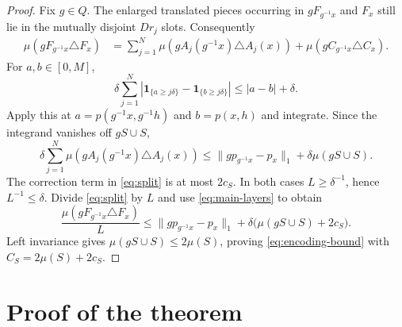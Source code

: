 \documentclass[11pt]{article}
\newcommand{\1}{\mathbf 1}
\begin{document}
\begin{proof}
Fix $g\in Q$.  The enlarged translated pieces occurring in
$gF_{g^{-1}x}$ and $F_x$ still lie in the mutually disjoint $Dr_j$ slots.
Consequently
\begin{align}
 \mu(gF_{g^{-1}x}\triangle F_x)
 &=\sum_{j=1}^N\mu(gA_j(g^{-1}x)\triangle A_j(x))
   +\mu(gC_{g^{-1}x}\triangle C_x).\label{eq:split}
\end{align}
For $a,b\in[0,M]$,
\begin{equation}\label{eq:scalar-quantization}
 \delta\sum_{j=1}^N
 \left|\1_{\{a\geq j\delta\}}-\1_{\{b\geq j\delta\}}\right|
 \leq |a-b|+\delta.
\end{equation}
Apply this at
$a=p(g^{-1}x,g^{-1}h)$ and $b=p(x,h)$ and integrate.  Since the integrand
vanishes off $gS\cup S$,
\begin{equation}\label{eq:main-layers}
 \delta\sum_{j=1}^N\mu(gA_j(g^{-1}x)\triangle A_j(x))
 \leq\|g p_{g^{-1}x}-p_x\|_1+\delta\mu(gS\cup S).
\end{equation}
The correction term in \eqref{eq:split} is at most $2c_S$.  In both cases
$L\geq\delta^{-1}$, hence $L^{-1}\leq\delta$.  Divide
\eqref{eq:split} by $L$ and use \eqref{eq:main-layers} to obtain
\[
 \frac{\mu(gF_{g^{-1}x}\triangle F_x)}{L}
 \leq\|g p_{g^{-1}x}-p_x\|_1
   +\delta\bigl(\mu(gS\cup S)+2c_S\bigr).
\]
Left invariance gives $\mu(gS\cup S)\leq2\mu(S)$, proving
\eqref{eq:encoding-bound} with
$C_S=2\mu(S)+2c_S$.
\end{proof}

\section{Proof of the theorem}
\end{document}
